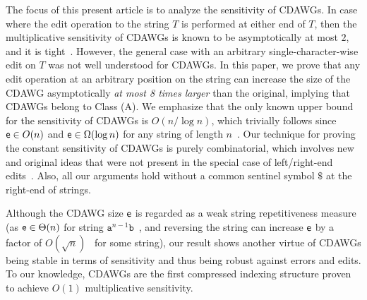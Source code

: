 The focus of this present article is to analyze the sensitivity of CDAWGs.
In case where the edit operation to the string $T$ is performed at either end of $T$,
then the multiplicative sensitivity of CDAWGs is known to be asymptotically at most $2$, and it is tight~\cite{InenagaHSTAMP05,FujimaruNI25}.
However, the general case with an arbitrary single-character-wise edit on $T$ was not well understood for CDAWGs.
In this paper, we prove that any edit operation at an arbitrary position
on the string can increase the size of the CDAWG asymptotically \emph{at most 8 times larger} than the original, implying that CDAWGs belong to Class (A).
We emphasize that the only known upper bound
for the sensitivity of CDAWGs is $O(n / \log n)$,
which trivially follows since $\mathsf{e} \in O(n)$ and $\mathsf{e} \in \Omega(\log n)$ for any string of length $n$~\cite{Blumer1987,BelazzouguiC17}.
%
Our technique for proving the constant sensitivity of CDAWGs is purely combinatorial, which involves new and original ideas that were not present in the special case of left/right-end edits~\cite{InenagaHSTAMP05,FujimaruNI25}.
Also, all our arguments hold without a common sentinel symbol $\$$ at the right-end of strings.

Although the CDAWG size $\mathsf{e}$ is regarded as a weak string repetitiveness measure
(as $\mathsf{e} \in \Theta(n)$ for string $\mathtt{a}^{n-1}\mathtt{b}$~\cite{Blumer1987}, and reversing the string can increase $\mathsf{e}$ by a factor of $O(\sqrt{n})$~\cite{InenagaK24} for some string),
our result shows another virtue of CDAWGs being stable in terms of sensitivity and thus being robust against errors and edits.
To our knowledge, CDAWGs are the first compressed indexing structure
proven to achieve $O(1)$ multiplicative sensitivity.
